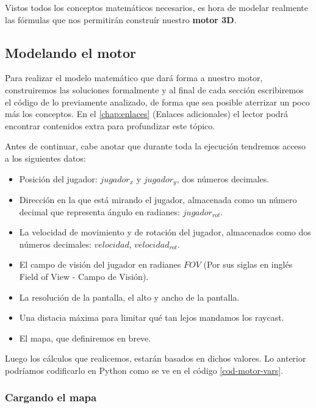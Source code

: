 Vistos todos los conceptos matemáticos necesarios, es hora de modelar realmente las fórmulas que nos permitirán construír nuestro \textbf{motor 3D}.

\subsection{Modelando el motor}

Para realizar el modelo matemático que dará forma a nuestro motor, construiremos las soluciones formalmente y al final de cada sección escribiremos el código de lo previamente analizado, de forma que sea posible aterrizar un poco más los conceptos. En el \autoref{chap:enlaces} (Enlaces adicionales) el lector podrá encontrar contenidos extra para profundizar este tópico.

Antes de continuar, cabe anotar que durante toda la ejecución tendremos acceso a los siguientes datos:

\begin{itemize}
	\item Posición del jugador: $jugador_x$ y $jugador_y$, dos números decimales.
	\item Dirección en la que está mirando el jugador, almacenada como un número decimal que representa ángulo en radianes: $jugador_{rot}$.
	\item La velocidad de movimiento y de rotación del jugador, almacenados como dos números decimales: $velocidad$,  $velocidad_{rot}$. 
	\item El campo de visión del jugador en radianes $FOV$ (Por sus siglas en inglés Field of View - Campo de Visión).
	\item La resolución de la pantalla, el alto y ancho de la pantalla.
	\item Una distacia máxima para limitar qué tan lejos mandamos los raycast.
	\item El mapa, que definiremos en breve.
\end{itemize}

Luego los cálculos que realicemos, estarán basados en dichos valores. Lo anterior podríamos codificarlo en Python como se ve en el código \ref{cod-motor-vars}.



\subsubsection{Cargando el mapa}


